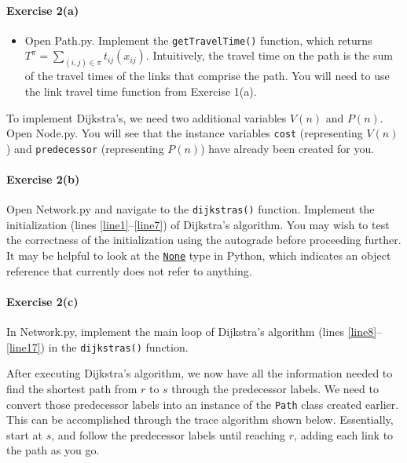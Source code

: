\documentclass[11pt]{article}
\begin{document}
\paragraph*{Exercise 2(a)} 
\begin{itemize}
	\item Open Path.py. 
	 Implement the \texttt{getTravelTime()} function, which returns $T^\pi = \sum_{(i,j)\in\pi} t_{ij}(x_{ij})$. Intuitively, the travel time on the path is the sum of the travel times of the links that comprise the path. You will need to use the link travel time function from Exercise 1(a).
\end{itemize}



\vspace{\baselineskip}

\noindent
To implement Dijkstra's, we need two additional variables $V(n)$ and $P(n)$.
Open Node.py. You will see that the instance variables \texttt{cost} (representing $V(n)$) and \texttt{predecessor} (representing $P(n)$) have already been created for you.


\paragraph*{Exercise 2(b)} Open Network.py and navigate to the \texttt{dijkstras()} function. Implement the initialization (lines \ref{line1}--\ref{line7}) of Dijkstra's algorithm. 
You may wish to test the correctness of the initialization using the autograde before proceeding further. It may be helpful to look at the \href{https://www.w3schools.com/python/ref_keyword_none.asp}{\texttt{None}} type in Python, which indicates an object reference that currently does not refer to anything. 


\paragraph*{Exercise 2(c)} In Network.py, implement the main loop of Dijkstra's algorithm (lines \ref{line8}--\ref{line17}) in the \texttt{dijkstras()} function. 

\vspace{\baselineskip}

\noindent
After executing Dijkstra's algorithm, we now have all the information needed to find the shortest path from $r$ to $s$ through the predecessor labels. We need to convert those predecessor labels into an instance of the \texttt{Path} class created earlier. This can be accomplished through the trace algorithm shown below. Essentially, start at $s$, and follow the predecessor labels until reaching $r$, adding each link to the path as you go. 
\end{document}
